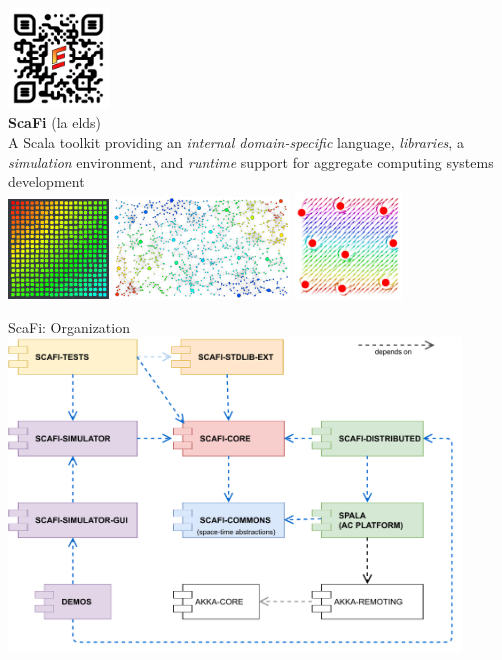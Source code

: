 \documentclass[presentation, 9pt]{beamer}\mode<presentation>{\usetheme{AMSBolognaFC}}
\begin{document}
\begin{frame}[c, plain]
\begin{center}
	\includegraphics[width=0.2\textwidth]{img/qr-code-scafi.png}\\
	{\Huge \textbf{ScaFi} (la elds)}\\
	{\large A Scala toolkit providing an \emph{internal domain-specific} language, \emph{libraries}, a \emph{simulation} environment, and \emph{runtime} support for  aggregate computing systems development} \\[0.3cm]
	\includegraphics[width=0.2\textwidth]{img/gradient-scafi.png}
	\includegraphics[width=0.35\textwidth]{img/scr-result.png}
	\includegraphics[width=0.215\textwidth]{img/obstacle-avoidance.png}
\end{center}
\end{frame}
\begin{frame}{ScaFi: Organization}
\centering
\includegraphics[width=0.9\textwidth]{img/scafi-project-org.pdf}
\end{frame}
\end{document}
